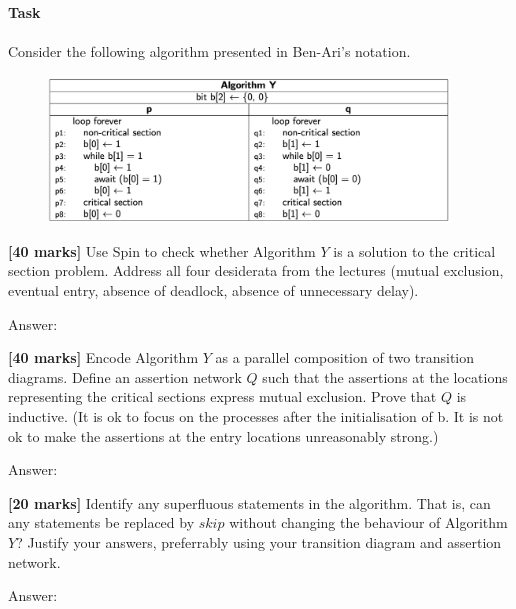 \documentclass{article}
\begin{document}
\Large\textbf{Task}\\\\
\normalsize
Consider the following algorithm presented in Ben-Ari's notation.
\begin{figure}[H]
    \centering 
    \includegraphics[width=0.95\textwidth]{DV_demand}
\end{figure}


\begin{Question}
\textbf{[40 marks]} Use Spin to check whether Algorithm $Y$ is a solution to the critical section problem. Address all four desiderata from the lectures (mutual exclusion, eventual entry, absence of deadlock, absence of unnecessary delay).

\begin{answer}
    Answer:\\
\end{answer}
\end{Question}




\begin{Question}
\textbf{[40 marks]} Encode Algorithm $Y$ as a parallel composition of two transition diagrams. Define an assertion network $Q$ such that the assertions at the locations representing the critical sections express mutual exclusion. Prove that $Q$ is inductive. (It is ok to focus on the processes after the initialisation of b. It is not ok to make the assertions at the entry locations unreasonably strong.)
\begin{answer}
    Answer:\\
\end{answer}
\end{Question}




\begin{Question}
\textbf{[20 marks]} Identify any superfluous statements in the algorithm. That is, can any statements be replaced by $skip$ without changing the behaviour of Algorithm $Y$? Justify your answers, preferrably using your transition diagram and assertion network.
\begin{answer}
    Answer:\\
\end{answer}
\end{Question}
\end{document}

